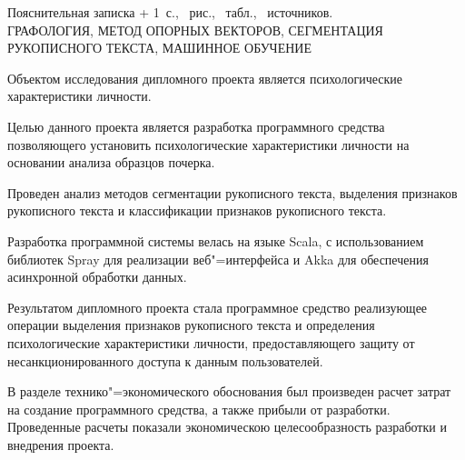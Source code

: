 
\newcommand{\totpages}{\number\numexpr{} + 1}

\begin{center}
    Пояснительная записка \totpages~с., \totfig{}~рис., \tottab{}~табл., \totref{}~источников.
    \\ 
    \MakeUppercase{графология, метод опорных векторов, сегментация рукописного текста, машинное обучение}
\end{center}

Объектом исследования дипломного проекта является психологические характеристики личности.

Целью данного проекта является разработка программного средства позволяющего установить психологические характеристики личности на основании анализа образцов почерка.

Проведен анализ методов сегментации рукописного текста, выделения признаков рукописного текста и классификации признаков рукописного текста.

Разработка программной системы велась на языке Scala, с использованием библиотек Spray для реализации веб"=интерфейса и Akka для обеспечения асинхронной обработки данных. 

Результатом дипломного проекта стала программное средство реализующее операции выделения признаков рукописного текста и определения психологические характеристики личности, предоставляющего защиту от несанкционированного доступа к данным пользователей.

В разделе технико"=экономического обоснования был произведен расчет затрат на создание программного средства, а также прибыли от разработки. Проведенные расчеты показали экономическою целесообразность разработки и внедрения проекта.

\clearpage